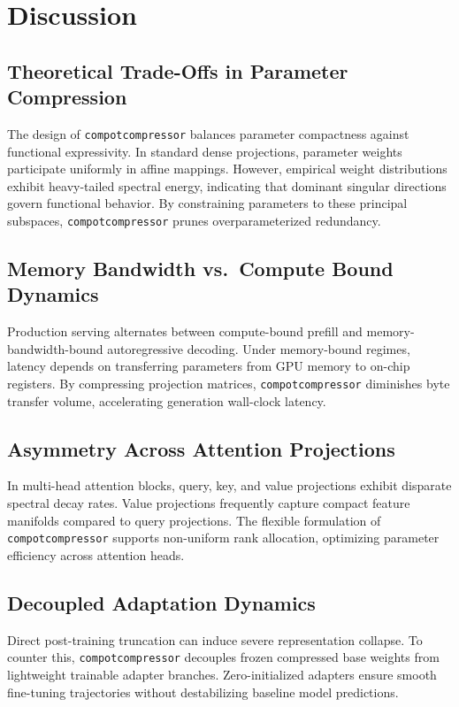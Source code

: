 \section{Discussion}

\subsection{Theoretical Trade-Offs in Parameter Compression}
The design of \texttt{compotcompressor} balances parameter compactness against functional expressivity. In standard dense projections, parameter weights participate uniformly in affine mappings. However, empirical weight distributions exhibit heavy-tailed spectral energy, indicating that dominant singular directions govern functional behavior. By constraining parameters to these principal subspaces, \texttt{compotcompressor} prunes overparameterized redundancy.

\subsection{Memory Bandwidth vs.\ Compute Bound Dynamics}
Production serving alternates between compute-bound prefill and memory-bandwidth-bound autoregressive decoding. Under memory-bound regimes, latency depends on transferring parameters from GPU memory to on-chip registers. By compressing projection matrices, \texttt{compotcompressor} diminishes byte transfer volume, accelerating generation wall-clock latency.

\subsection{Asymmetry Across Attention Projections}
In multi-head attention blocks, query, key, and value projections exhibit disparate spectral decay rates. Value projections frequently capture compact feature manifolds compared to query projections. The flexible formulation of \texttt{compotcompressor} supports non-uniform rank allocation, optimizing parameter efficiency across attention heads.

\subsection{Decoupled Adaptation Dynamics}
Direct post-training truncation can induce severe representation collapse. To counter this, \texttt{compotcompressor} decouples frozen compressed base weights from lightweight trainable adapter branches. Zero-initialized adapters ensure smooth fine-tuning trajectories without destabilizing baseline model predictions.

